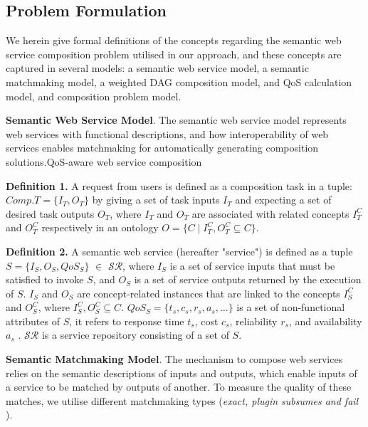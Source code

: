\documentclass{llncs}
\begin{document}
\subsection{Problem Formulation}\label{Motivation}

We herein give formal definitions of the concepts regarding the semantic web service composition problem utilised in our approach, and these concepts are captured in several models: a semantic web service model, a semantic matchmaking model, a weighted DAG composition model, and QoS calculation model, and composition problem model.

\textbf{Semantic Web Service Model}. The semantic web service model represents web services with functional descriptions, and how interoperability of web services enables matchmaking for automatically generating composition solutions.QoS-aware web service composition \cite{da2016particle,da2015graphevol,yu2013adaptive,ma2015hybrid}

\textbf{Definition 1.} A request from users is defined as a composition task in a tuple: $Comp.T = \{I_{T}, O_{T}\}$ by giving a set of task inputs $I_{T}$ and expecting  a set of desired task outputs $O_{T}$, where $I_{T}$ and $O_{T}$ are associated with related concepts $I^{C}_{T}$ and $O^{C}_{T}$ respectively in an ontology $O = \{ C \mid I^{C}_{T}, O^{C}_{T}  \subseteq C \}$.

\textbf{Definition 2.} A semantic web service (hereafter "service") is defined as a tuple $S = \{ I_{S}, O_{S}, QoS_S \}$ $\in$ $\mathcal{SR}$, where $I_{S}$ is a set of service inputs that must be satisfied to invoke $S$, and $O_{S}$ is a set of service outputs returned by the execution of $S$. $I_{S}$ and $O_{S}$ are concept-related instances that are linked to the concepts $I^{C}_{S}$ and $O^{C}_{S}$, where $ I^{C}_{S}, O^{C}_{S}  \subseteq C$. $QoS_S = \{ t_s, c_s, r_s, a_s, ... \} $ is a set of non-functional attributes of $S$, it refers to response time $t_s$, cost $c_s$, reliability $r_s$, and availability $a_s$ \cite{zeng2003quality}. $\mathcal{SR}$ is a service repository consisting of a set of $S$.
\vspace{0.3cm}

\textbf{Semantic Matchmaking Model}. The mechanism to compose web services relies on the semantic descriptions of inputs and outputs, which enable inputs of a service to be matched by outputs of another. To measure the quality of these matches, we utilise different matchmaking types (\textit{exact, plugin subsumes and fail} \cite{paolucci2002semantic} ).
\end{document}
